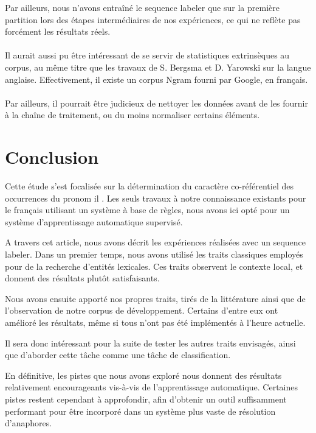 \documentclass[a4paper,12pt]{article}
\begin{document}
Par ailleurs, nous n'avons entraîné le sequence labeler que sur la première partition lors des étapes intermédiaires de nos expériences, ce qui ne reflète pas forcément les résultats réels.

\paragraph{}
Il aurait aussi pu être intéressant de se servir de statistiques extrinsèques au corpus, au même titre que les travaux de S. Bergsma et D. Yarowski sur la langue anglaise. Effectivement, il existe un corpus Ngram fourni par Google, en français.

\paragraph{}
Par ailleurs, il pourrait être judicieux de nettoyer les données avant de les fournir à la chaîne de traitement, ou du moins normaliser certains éléments.


\section*{Conclusion}

Cette étude s'est focalisée sur la détermination du caractère co-référentiel des occurrences du pronom \og il \fg{}. Les seuls travaux à notre connaissance existants pour le français utilisant un système à base de règles, nous avons ici opté pour un système d'apprentissage automatique supervisé.

A travers cet article, nous avons décrit les expériences réalisées avec un sequence labeler. Dans un premier temps, nous avons utilisé les traits classiques employés pour de la recherche d'entités lexicales. Ces traits observent le contexte local, et donnent des résultats plutôt satisfaisants.

Nous avons ensuite apporté nos propres traits, tirés de la littérature ainsi que de l'observation de notre corpus de développement. Certains d'entre eux ont amélioré les résultats, même si tous n'ont pas été implémentés à l'heure actuelle.

Il sera donc intéressant pour la suite de tester les autres traits envisagés, ainsi que d'aborder cette tâche comme une tâche de classification.

En définitive, les pistes que nous avons exploré nous donnent des résultats relativement encourageants vis-à-vis de l'apprentissage automatique. Certaines pistes restent cependant à approfondir, afin d'obtenir un outil suffisamment performant pour être incorporé dans un système plus vaste de résolution d'anaphores.



\end{document}
